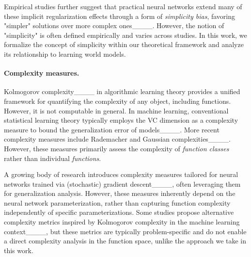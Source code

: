 Empirical studies further suggest that practical neural networks extend many of these implicit regularization effects through a form of \emph{simplicity bias}, favoring "simpler" solutions over more complex ones____. However, the notion of "simplicity" is often defined empirically and varies across studies. In this work, we formalize the concept of simplicity within our theoretical framework and analyze its relationship to learning world models.


\paragraph{Complexity measures.} Kolmogorov complexity____ in algorithmic learning theory provides a unified framework for quantifying the complexity of any object, including functions. However, it is not computable in general. In machine learning, conventional statistical learning theory typically employs the VC dimension as a complexity measure to bound the generalization error of models____. More recent complexity measures include Rademacher and Gaussian complexities____. However, these measures primarily assess the complexity of \emph{function classes} rather than individual \emph{functions}.

A growing body of research introduces complexity measures tailored for neural networks trained via (stochastic) gradient descent____, often leveraging them for generalization analysis. However, these measures inherently depend on the neural network parameterization, rather than capturing function complexity independently of specific parameterizations. Some studies propose alternative complexity metrics inspired by Kolmogorov complexity in the machine learning context____, but these metrics are typically problem-specific and do not enable a direct complexity analysis in the function space, unlike the approach we take in this work.

